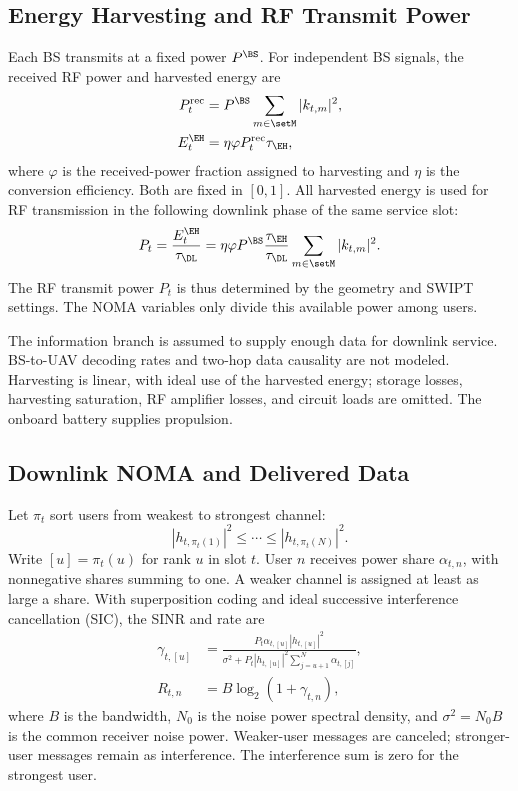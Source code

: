 \subsection{Energy Harvesting and RF Transmit Power}
Each BS transmits at a fixed power $P^{\BS}$. For independent BS signals, the received RF power and harvested energy are
\begin{align}
P_t^{\mathrm{rec}}&=P^{\BS}\sum_{m\in\setM}|k_{t,m}|^2,\label{eq:received_power}\\
E_t^{\EH}&=\eta\varphi P_t^{\mathrm{rec}}\tau_{\EH},
\label{eq:harvested_energy}
\end{align}
where $\varphi$ is the received-power fraction assigned to harvesting and $\eta$ is the conversion efficiency. Both are fixed in $[0,1]$. All harvested energy is used for RF transmission in the following downlink phase of the same service slot:
\begin{equation}
P_t=\frac{E_t^{\EH}}{\tau_{\DL}}
=\eta\varphi P^{\BS}\frac{\tau_{\EH}}{\tau_{\DL}}
\sum_{m\in\setM}|k_{t,m}|^2.
\label{eq:uav_power}
\end{equation}
The RF transmit power $P_t$ is thus determined by the geometry and SWIPT settings. The NOMA variables only divide this available power among users.

The information branch is assumed to supply enough data for downlink service. BS-to-UAV decoding rates and two-hop data causality are not modeled. Harvesting is linear, with ideal use of the harvested energy; storage losses, harvesting saturation, RF amplifier losses, and circuit loads are omitted. The onboard battery supplies propulsion.

\subsection{Downlink NOMA and Delivered Data}
Let $\pi_t$ sort users from weakest to strongest channel:
\begin{equation}
|h_{t,\pi_t(1)}|^2\le\cdots\le|h_{t,\pi_t(N)}|^2.
\label{eq:sic_order}
\end{equation}
Write $[u]=\pi_t(u)$ for rank $u$ in slot $t$. User $n$ receives power share $\alpha_{t,n}$, with nonnegative shares summing to one. A weaker channel is assigned at least as large a share. With superposition coding and ideal successive interference cancellation (SIC), the SINR and rate are
\begin{align}
\gamma_{t,[u]}&=
\frac{P_t\alpha_{t,[u]}|h_{t,[u]}|^2}
{\sigma^2+P_t|h_{t,[u]}|^2\sum_{j=u+1}^{N}\alpha_{t,[j]}},
\label{eq:sinr}\\
R_{t,n}&=B\log_2(1+\gamma_{t,n}),
\label{eq:rate}
\end{align}
where $B$ is the bandwidth, $N_0$ is the noise power spectral density, and $\sigma^2=N_0B$ is the common receiver noise power. Weaker-user messages are canceled; stronger-user messages remain as interference. The interference sum is zero for the strongest user.

